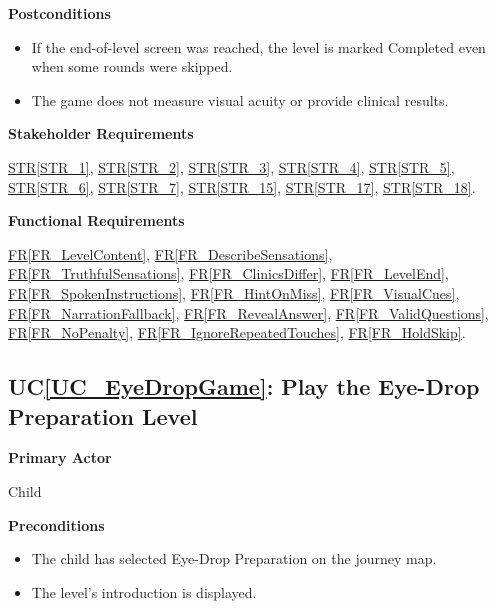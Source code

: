 \documentclass[10pt]{article}
\newcommand{\strref}[1]{\hyperref[#1]{STR\ref*{#1}}}
\newcounter{ucnum} %
\newcommand{\ucheading}[1]{UC\ref*{#1}}
\newcommand{\rref}[1]{\hyperref[#1]{FR\ref*{#1}}}
\begin{document}
\textbf{Postconditions}
\begin{itemize}
    \item If the end-of-level screen was reached, the level is
    marked Completed even when some rounds were skipped.
    \item The game does not measure visual acuity or provide
    clinical results.
\end{itemize}

\textbf{Stakeholder Requirements}

\strref{STR_1}, \strref{STR_2}, \strref{STR_3}, \strref{STR_4}, \strref{STR_5}, \strref{STR_6}, \strref{STR_7}, \strref{STR_15}, \strref{STR_17}, \strref{STR_18}.

\textbf{Functional Requirements}

\rref{FR_LevelContent}, \rref{FR_DescribeSensations}, \rref{FR_TruthfulSensations}, \rref{FR_ClinicsDiffer}, \rref{FR_LevelEnd}, \rref{FR_SpokenInstructions}, \rref{FR_HintOnMiss}, \rref{FR_VisualCues}, \rref{FR_NarrationFallback}, \rref{FR_RevealAnswer}, \rref{FR_ValidQuestions}, \rref{FR_NoPenalty}, \rref{FR_IgnoreRepeatedTouches}, \rref{FR_HoldSkip}.

\label{UC_EyeDropGame}
\subsection{\ucheading{UC_EyeDropGame}: Play the Eye-Drop Preparation Level}

\textbf{Primary Actor}

Child

\textbf{Preconditions}
\begin{itemize}
    \item The child has selected Eye-Drop Preparation on the journey map.
    \item The level's introduction is displayed.
\end{itemize}
\end{document}
